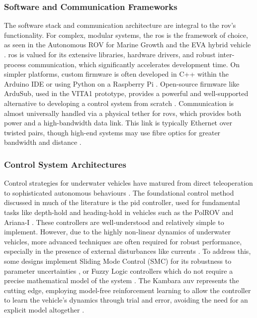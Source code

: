 \documentclass[11pt, a4paper]{article}
\begin{document}
\subsubsection{Software and Communication Frameworks}
The software stack and communication architecture are integral to the \gls{rov}'s functionality. For complex, modular systems, the \gls{ros} is the framework of choice, as seen in the Autonomous ROV for Marine Growth and the EVA hybrid vehicle \cite{9965928, 8558880}. \gls{ros} is valued for its extensive libraries, hardware drivers, and robust inter-process communication, which significantly accelerates development time. On simpler platforms, custom firmware is often developed in C++ within the Arduino IDE or using Python on a Raspberry Pi \cite{9659412}. Open-source firmware like ArduSub, used in the VITA1 prototype, provides a powerful and well-supported alternative to developing a control system from scratch \cite{9447108}. Communication is almost universally handled via a physical tether for \gls{rov}s, which provides both power and a high-bandwidth data link. This link is typically Ethernet over twisted pairs, though high-end systems may use fibre optics for greater bandwidth and distance \cite{9962007}.

\subsubsection{Control System Architectures}
Control strategies for underwater vehicles have matured from direct teleoperation to sophisticated autonomous behaviours \cite{5355247}. The foundational control method discussed in much of the literature is the \gls{pid} controller, used for fundamental tasks like depth-hold and heading-hold in vehicles such as the PolROV and Ariana-I \cite{10928203, marzbanrad_2011_design}. These controllers are well-understood and relatively simple to implement. However, due to the highly non-linear dynamics of underwater vehicles, more advanced techniques are often required for robust performance, especially in the presence of external disturbances like currents \cite{5355247}. To address this, some designs implement Sliding Mode Control (SMC) for its robustness to parameter uncertainties \cite{5355247}, or Fuzzy Logic controllers which do not require a precise mathematical model of the system \cite{7946564}. The Kambara \gls{auv} represents the cutting edge, employing model-free reinforcement learning to allow the controller to learn the vehicle's dynamics through trial and error, avoiding the need for an explicit model altogether \cite{wettergreen1999autonomous}.
\end{document}
